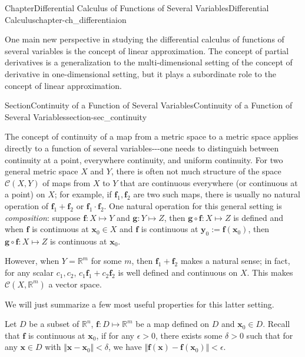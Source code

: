 \documentclass[oneside,10pt,]{book}
\numberwithin{equation}{section}
\newcommand{\bff}{\mathbf{f}}
\newcommand{\bg}{\mathbf{g}}
\newcommand{\bx}{\mathbf{x}}
\newcommand{\by}{\mathbf{y}}
\newcommand{\bbR}{\mathbb{R}}
\newcommand{\cC}{\mathcal{C}}
\newcommand{\lt}{<}
\newcommand{\gt}{>}
\begin{document}
%
\begin{chapterptx}{Chapter}{Differential Calculus of Functions of Several Variables}{}{Differential Calculus}{}{}{chapter-ch_differentiaion}
\renewcommand*{\chaptername}{Chapter}
\begin{introduction}{}%
One main new perspective in studying the differential calculus of functions of several variables is the concept of linear approximation. The concept of  partial derivatives is a generalization to the multi-dimensional setting of the concept of derivative in one-dimensional setting, but it plays a subordinate role to the concept of linear approximation.\end{introduction}%
%
%
\typeout{************************************************}
\typeout{************************************************}
%
\begin{sectionptx}{Section}{Continuity of a Function of Several Variables}{}{Continuity of a Function of Several Variables}{}{}{section-sec_continuity}
\begin{introduction}{}%
The concept of continuity of a map from a metric space to a metric space applies directly to a function of several variables-{}-{}-one needs to distinguish between continuity at a point, everywhere continuity, and uniform continuity. For two general metric space \(X\) and \(Y\), there is often not much structure of the space \(\cC(X, Y)\) of maps from \(X\) to \(Y\) that are continuous everywhere  (or continuous at a point) on \(X\); for example, if \(\bff_{1},\bff_{2}\) are two such maps, there is usually no natural operation of \(\bff_{1}+\bff_{2}\) or \(\bff_{1}\cdot \bff_{2}\). One natural operation for this general setting is \emph{composition}: suppose \(\bff: X\mapsto Y\) and \(\bg:Y\mapsto Z\), then \(\bg\circ\bff:X\mapsto Z\) is defined and when \(\bff\) is continuous at \(\bx_0\in X\) and \(\bff\) is continuous at \(\by_0:=\bff(\bx_0)\), then \(\bg\circ\bff:X\mapsto Z\) is  continuous at \(\bx_0\).%
\par
However, when \(Y=\bbR^{m}\) for some \(m\), then \(\bff_{1}+\bff_{2}\) makes a natural sense; in fact, for any scalar \(c_{1}, c_{2}\), \(c_{1}\bff_{1}+c_{2}\bff_{2}\) is well defined and continuous  on \(X\). This makes \(\cC(X, \bbR^{m})\) a vector space.%
\par
We will just summarize a few most useful properties for this latter setting.%
\end{introduction}%
Let \(D\) be a subset of \(\bbR^{n}\), \(\bff :D\mapsto \bbR^{m}\) be a map defined on \(D\) and \(\bx_{0}\in D\). Recall that \(\bff\) is continuous at \(\bx_{0}\), if for any \(\epsilon \gt 0\), there exists some \(\delta \gt 0\) such that for any \(\bx \in D\) with \(\Vert \bx -\bx_{0}\Vert \lt \delta\), we have \(\Vert \bff (\bx) -\bff(\bx_{0})\Vert \lt \epsilon\).%

\end{sectionptx}
\end{chapterptx}
\end{document}
